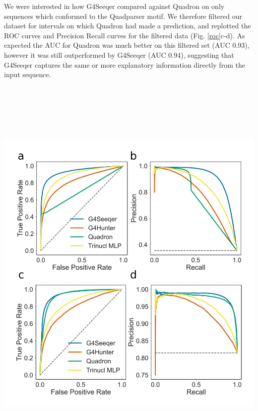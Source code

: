 \documentclass[12pt,a4paper,]{report}
\let\origfigure=\figure
\let\endorigfigure=\endfigure
\renewenvironment{figure}[1][2] {
    \expandafter\origfigure\expandafter[H]
} {
    \endorigfigure
}
\begin{document}
We were interested in how G4Seeqer compared against Quadron on only
sequences which conformed to the Quadparser motif. We therefore filtered
our dataset for intervals on which Quadron had made a prediction, and
replotted the ROC curves and Precision Recall curves for the filtered
data (Fig. \ref{roc}c-d). As expected the AUC for Quadron was much
better on this filtered set (AUC 0.93), however it was still
outperformed by G4Seeqer (AUC 0.94), suggesting that G4Seeqer captures
the same or more explanatory information directly from the input
sequence.

\newpage

\begin{figure}[htbp]
\centering
\includegraphics[width=\textwidth,height=562pt,keepaspectratio]{chapter_3/figures/test_set_roc_pr.png}

\end{figure}
\end{document}

